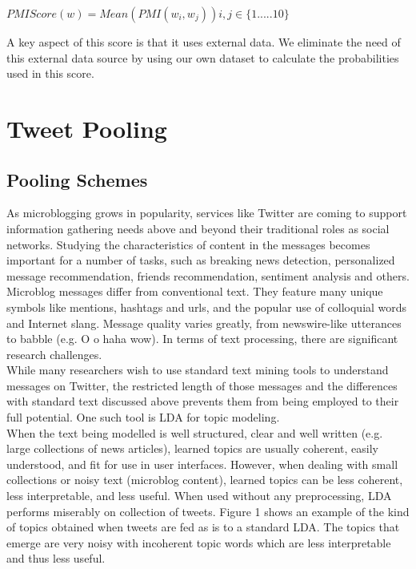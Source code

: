 \documentclass[10pt,a5paper,twoside]{article}
\begin{document}
\begin{center}
$ PMI Score(w) = Mean ( PMI(w_i,w_j) ) i,j \in \lbrace1.....10\rbrace $
\end{center}

A key aspect of this score is that it uses external data. We eliminate the need of this external data source by using our own dataset to calculate the probabilities used in this score.


\section{Tweet Pooling}

\subsection{Pooling Schemes}

As microblogging grows in popularity, services like Twitter are coming to support information gathering needs above and beyond their traditional roles as social networks. Studying the characteristics of content in the messages becomes important for a number of tasks, such as breaking news detection, personalized message recommendation, friends recommendation, sentiment analysis and others. 
\\
Microblog messages differ from conventional text. They feature many unique symbols like mentions, hashtags and urls, and the popular use of colloquial words and Internet slang. Message quality varies greatly, from newswire-like utterances  to babble (e.g. O o haha wow). In terms of text processing, there are significant research challenges.
\\
While many researchers wish to use standard text mining tools to understand messages on Twitter, the restricted length of those messages and the differences with standard text discussed above prevents them from being employed to their full potential. One such tool is LDA for topic modeling.  
\\

When the text being modelled is well structured, clear and well written (e.g. large collections of news articles), learned topics are usually coherent, easily understood, and fit for use in user interfaces. However, when dealing with small collections or noisy text (microblog content), learned topics can be less coherent, less interpretable, and less useful. When used without any preprocessing, LDA performs miserably on collection of tweets. Figure 1 shows an example of the kind of topics obtained when tweets are fed as is to a standard LDA. The topics that emerge are very noisy with incoherent topic words which are less interpretable and thus less useful.
\\
\end{document}
